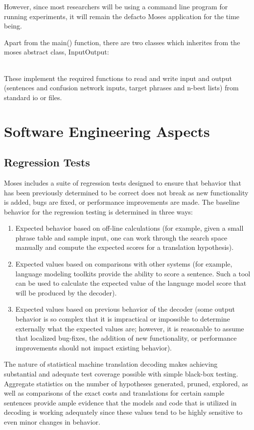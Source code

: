 \documentclass[11pt]{report}
\theoremstyle{plain}
\begin{document}
{However, since most researchers will be using a command line program for running experiments, it will remain the defacto Moses application for the time being.

Apart from the main() function, there are two classes which inherites from the moses abstract class, InputOutput:\\
\\

These implement the required functions to read and write input and output (sentences and confusion network inputs, target phrases and n-best lists) from standard io or files.

\section{Software Engineering Aspects}

\subsection{Regression Tests}
Moses includes a suite of regression tests designed to ensure that
behavior that has been previously determined to be correct does not
break as new functionality is added, bugs are fixed, or performance
improvements are made. The baseline behavior for the regression
testing is determined in three ways:
\begin{enumerate}
  \item Expected behavior based on off-line calculations (for example,
  given a small phrase table and sample input, one can work through
  the search space manually and compute the expected scores for a translation hypothesis).
  \item Expected values based on comparisons with other systems (for
  example, language modeling toolkits provide the ability to score
  a sentence.  Such a tool can be used to calculate the expected value of
  the language model score that will be produced by the decoder).
  \item Expected values based on previous behavior of the decoder (some output behavior
  is so complex that it is impractical or impossible to determine externally
  what the expected values are; however, it is reasonable to assume that localized bug-fixes,
  the addition of new functionality, or performance improvements should not impact existing
  behavior).
\end{enumerate}
The nature of statistical machine translation decoding makes
achieving substantial and adequate test coverage possible with
simple black-box testing.  Aggregate statistics on the number of
hypotheses generated, pruned, explored, as well as comparisons of
the exact costs and translations for certain sample sentences
provide ample evidence that the models and code that is utilized in
decoding is working adequately since these values tend to be highly
sensitive to even minor changes in behavior.

}
\end{document}

